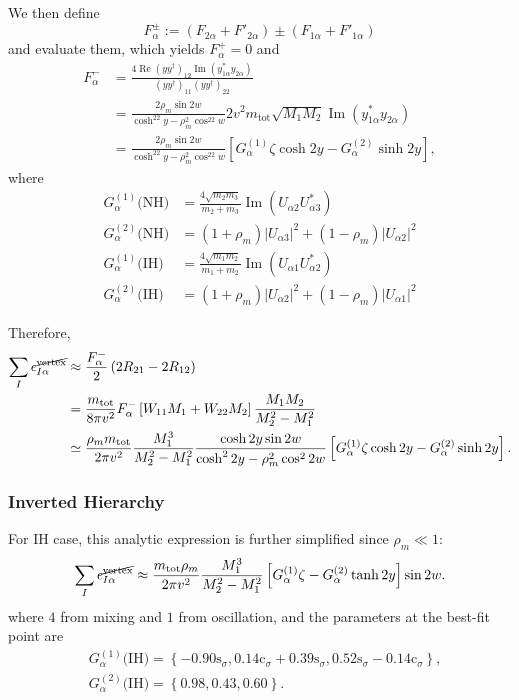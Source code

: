\documentclass[a4paper,11pt]{scrartcl}
\numberwithin{equation}{section}
\newcommand\co[1]{\mathrm{c}_{#1}}
\newcommand\si[1]{\mathrm{s}_{#1}}
\renewcommand{\Re}{\mathop{\mathrm{Re}}}
\renewcommand{\Im}{\mathop{\mathrm{Im}}}
\newcommand\mtot{m_{\mathrm{tot}}}
\newcommand\yydag{(yy^\dagger)}
\begin{document}
We then define
\begin{equation}
 F^{\pm}_\alpha := (F_{2\alpha}+F'_{2\alpha})\pm(F_{1\alpha}+F'_{1\alpha})
\end{equation}
and evaluate them, which yields $F^+_\alpha=0$ and
\begin{align}
 F^-_\alpha
&=
\frac{4\Re\yydag_{12}\Im(y_{1\alpha}^*y_{2\alpha})}{\yydag_{11}\yydag_{22}}
\\&=
\frac{2\rho_m\sin2w}{\cosh^22y-\rho_m^2\cos^22w}{2v^2}{\mtot\sqrt{M_1 M_2}}
\Im(y_{1\alpha}^*y_{2\alpha})
\\
&=\frac{2\rho_m\sin2w}{\cosh^22y-\rho_m^2\cos^22w}
\left[
G^{(1)}_\alpha \zeta\cosh2y - G^{(2)}_\alpha\sinh2y
\right],
\end{align}
where
\begin{align}
  G^{(1)}_\alpha\text{(NH)}
&= \frac{4\sqrt{m_2m_3}}{m_2+m_3}\Im\left(U_{\alpha2}U_{\alpha3}^*\right)\\
  G^{(2)}_\alpha\text{(NH)}
&= (1+\rho_m)|U_{\alpha3}|^2+(1-\rho_m)|U_{\alpha2}|^2\\
  G^{(1)}_\alpha\text{(IH)}
&= \frac{4\sqrt{m_1m_2}}{m_1+m_2}\Im\left(U_{\alpha1}U_{\alpha2}^*\right)\\
  G^{(2)}_\alpha\text{(IH)}
&= (1+\rho_m)|U_{\alpha2}|^2+(1-\rho_m)|U_{\alpha1}|^2
\end{align}

Therefore,
\begin{align}
 \sum_I\epsilon^{\cancel{\text{vertex}}}_{I\alpha}
&\approx
\frac{F^-_\alpha}{2}\left(2R_{21}-2R_{12}\right)
\\
&=
\frac{\mtot}{8\pi v^2}F^-_\alpha\left[W_{11}M_1+W_{22}M_2\right]\frac{M_1M_2}{M_2^2-M_1^2}
\\&\simeq
\frac{\rho_m\mtot}{2\pi v^2}\frac{M_1^3}{M_2^2-M_1^2}
\frac{\cosh2y\sin2w}{\cosh^22y-\rho_m^2\cos^22w}
\left[
G^{(1)}_\alpha \zeta\cosh2y - G^{(2)}_\alpha\sinh2y
\right].
\end{align}
\subsubsection{Inverted Hierarchy}
For IH case, this analytic expression is further simplified since $\rho_m\ll 1$:
\begin{equation}
 \sum_I\epsilon^{\cancel{\text{vertex}}}_{I\alpha}
 \approx
\frac{\mtot\rho_m}{2\pi v^2}\frac{M_1^3}{M_2^2-M_1^2}
\left[G^{(1)}_\alpha \zeta - G^{(2)}_\alpha\tanh2y\right]\sin2w.
\end{equation}
where $4$ from mixing and $1$ from oscillation, and the parameters at the best-fit point are
\begin{align}
 &G^{(1)}_\alpha\text{(IH)}=\left\{
 -0.90\si\sigma, 0.14\co\sigma+0.39\si\sigma, 0.52\si\sigma-0.14\co\sigma
\right\},\\
 &G^{(2)}_\alpha\text{(IH)}=\left\{
   0.98, 0.43, 0.60
\right\}.
\end{align}
\end{document}
